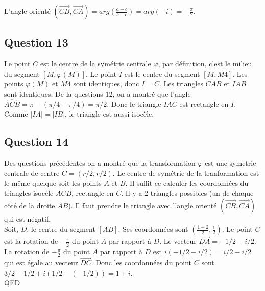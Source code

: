 \documentclass[]{book}
\theoremstyle{definition}
\begin{document}
L'angle orient\'e $(\overrightarrow{CB}, \overrightarrow{CA}) = arg(\frac{a-c}{b-c}) = arg(-i) = -\frac{\pi}{2}$.


\subsection*{Question 13}
Le point $C$ est le centre de la sym\'etrie centrale $\varphi$, par d\'efinition, c'est le milieu du segment $[M,\varphi(M)]$. Le point $I$ est le centre du segment $[M, M4]$. Les points $\varphi(M)$ et $M4$ sont identiques, donc $I=C$. Les triangles $CAB$ et $IAB$ sont identiques. De la questions 12, on a montr\'e que l'angle $\widehat{ACB} = \pi - (\pi/4+\pi/4) = \pi/2$. Donc le triangle $IAC$ est rectangle en $I$. Comme $|IA|=|IB|$, le triangle est aussi isoc\`ele. 

\subsection*{Question 14}
Des questions pr\'ec\'edentes on a montr\'e que la transformation $\varphi$ est une symetrie centrale de centre $C = (r/2, r/2)$. Le centre de sym\'etrie de la tranformation est le m\^eme quelque soit les points $A$ et $B$. Il suffit ce calculer les coordonn\'ees du triangles isoc\`ele $ACB$, rectangle en $C$. Il y a 2 triangles possibles (un de chaque c\^ot\'e de la droite $AB$). Il faut prendre le triangle avec l'angle orient\'e $(\overrightarrow{CB}, \overrightarrow{CA})$ qui est n\'egatif.\\

Soit, $D$, le centre du segment $[AB]$. Ses coordonn\'ees sont $(\frac{1+2}{2}, \frac{1}{2})$. Le point $C$ est la rotation de $-\frac{\pi}{2}$ du point $A$ par rapport \`a $D$. Le vecteur $\overrightarrow{DA} = -1/2 -i/2$. La rotation de $-\frac{\pi}{2}$ du point $A$ par rapport \`a $D$ est $i(-1/2 -i/2) = i/2 - i/2$ qui est \'egale au vecteur $\overrightarrow{DC}$. Donc les coordonn\'ees du point $C$ sont $3/2-1/2+i(1/2-(-1/2)) = 1 + i$.
\\

QED
\end{document}
